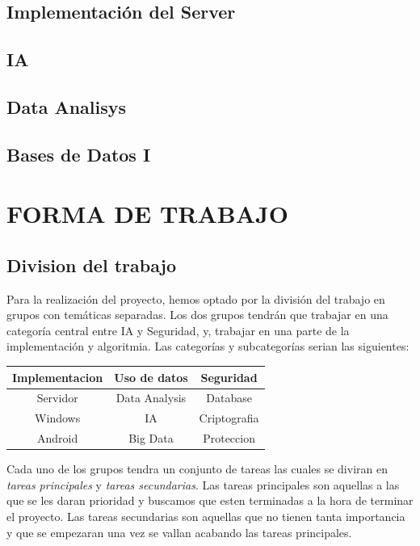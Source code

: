 \documentclass{article}
\theoremstyle{definition}
\begin{document}
\subsection{Implementación del Server}

\subsection{IA}

\subsection{Data Analisys}

\subsection{Bases de Datos I}

\section{FORMA DE TRABAJO}

\subsection{Division del trabajo}

Para la realización del proyecto, hemos optado por la división del trabajo en grupos con temáticas separadas. Los dos grupos tendrán que trabajar en una categoría central entre IA y Seguridad, y, trabajar en una parte de la implementación y algoritmia. Las categorías y subcategorías serian las siguientes:

\begin{center}
\begin{tabular}{|c|c|c|}
	\hline	
	\cellcolor{cyan!12} Implementacion & \cellcolor{cyan!12}Uso de datos & \cellcolor{cyan!12}Seguridad \\ \hline
	Servidor & Data Analysis & Database \\
	Windows & IA & Criptografia \\
	Android & Big Data & Proteccion \\
	\hline
	
\end{tabular}
\end{center}



Cada uno de los grupos tendra un conjunto de tareas las cuales se diviran en \textit{tareas principales} y \textit{tareas secundarias}. Las tareas principales son aquellas a las que se les daran prioridad y buscamos que esten terminadas a la hora de terminar el proyecto. Las tareas secundarias son aquellas que no tienen tanta importancia y que se empezaran una vez se vallan acabando las tareas principales.
\end{document}
